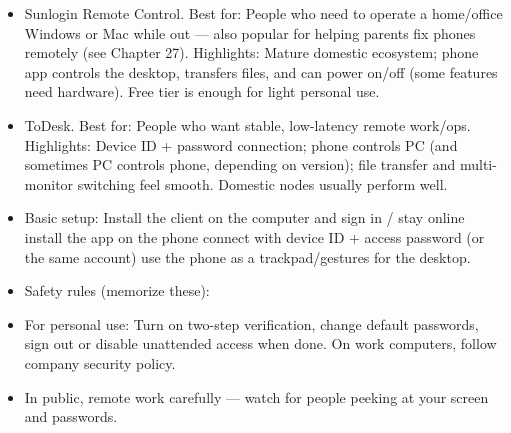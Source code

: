\begin{itemize}
  \item Sunlogin Remote Control. Best for: People who need to operate a home/office Windows or Mac while out — also popular for helping parents fix phones remotely (see Chapter 27). Highlights: Mature domestic ecosystem; phone app controls the desktop, transfers files, and can power on/off (some features need hardware). Free tier is enough for light personal use.
  \item ToDesk. Best for: People who want stable, low-latency remote work/ops. Highlights: Device ID + password connection; phone controls PC (and sometimes PC controls phone, depending on version); file transfer and multi-monitor switching feel smooth. Domestic nodes usually perform well.
  \item Basic setup: Install the client on the computer and sign in / stay online install the app on the phone connect with device ID + access password (or the same account) use the phone as a trackpad/gestures for the desktop.
  \item Safety rules (memorize these):
  \item For personal use: Turn on two-step verification, change default passwords, sign out or disable unattended access when done. On work computers, follow company security policy.
  \item In public, remote work carefully — watch for people peeking at your screen and passwords.
\end{itemize}


